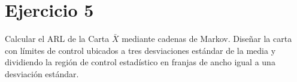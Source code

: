 \documentclass[11pt]{article}\usepackage[]{graphicx}\usepackage[table]{xcolor}
\begin{document}
\section*{Ejercicio 5}
Calcular el ARL de la Carta $\bar{X}$ mediante cadenas de Markov. Diseñar la carta con límites de control ubicados a tres desviaciones estándar de la media y dividiendo la región de control estadístico en franjas de ancho igual a una desviación estándar.
\end{document}
